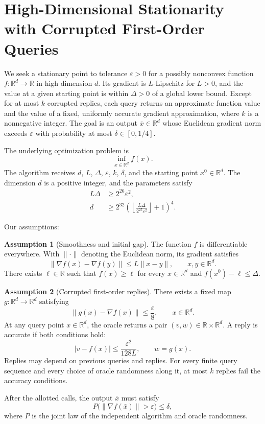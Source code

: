 \documentclass[10pt]{article}
\theoremstyle{definition}
\newtheorem{assumption}{Assumption}
\begin{document}
\section*{High-Dimensional Stationarity with Corrupted First-Order Queries}
We seek a stationary point to tolerance $\varepsilon>0$ for a possibly nonconvex function $f:\mathbb{R}^d\to\mathbb{R}$ in high dimension $d$. Its gradient is $L$-Lipschitz for $L>0$, and the value at a given starting point is within $\Delta>0$ of a global lower bound. Except for at most $k$ corrupted replies, each query returns an approximate function value and the value of a fixed, uniformly accurate gradient approximation, where $k$ is a nonnegative integer. The goal is an output $\bar{x}\in\mathbb{R}^d$ whose Euclidean gradient norm exceeds $\varepsilon$ with probability at most $\delta\in[0,1/4]$.

The underlying optimization problem is
\[
\inf_{x\in\mathbb{R}^d} f(x).
\]
The algorithm receives $d$, $L$, $\Delta$, $\varepsilon$, $k$, $\delta$, and the starting point $x^0\in\mathbb{R}^d$. The dimension $d$ is a positive integer, and the parameters satisfy
\[
\begin{aligned}
L\Delta &\geq 2^{26}\varepsilon^2,\\
d &\geq 2^{32}\left(\left\lfloor\frac{L\Delta}{2^{25}\varepsilon^2}\right\rfloor+1\right)^4.
\end{aligned}
\]

Our assumptions:
\begin{assumption}[Smoothness and initial gap]
The function $f$ is differentiable everywhere. With $\|\cdot\|$ denoting the Euclidean norm, its gradient satisfies
\[
\|\nabla f(x)-\nabla f(y)\|\leq L\|x-y\|,\qquad x,y\in\mathbb{R}^d.
\]
There exists $\ell\in\mathbb{R}$ such that $f(x)\geq\ell$ for every $x\in\mathbb{R}^d$ and $f(x^0)-\ell\leq\Delta$.
\end{assumption}

\begin{assumption}[Corrupted first-order replies]
There exists a fixed map $g:\mathbb{R}^d\to\mathbb{R}^d$ satisfying
\[
\|g(x)-\nabla f(x)\|\leq\frac{\varepsilon}{8},\qquad x\in\mathbb{R}^d.
\]
At any query point $x\in\mathbb{R}^d$, the oracle returns a pair $(v,w)\in\mathbb{R}\times\mathbb{R}^d$. A reply is accurate if both conditions hold:
\[
|v-f(x)|\leq\frac{\varepsilon^2}{128L},\qquad w=g(x).
\]
Replies may depend on previous queries and replies. For every finite query sequence and every choice of oracle randomness along it, at most $k$ replies fail the accuracy conditions.
\end{assumption}

After the allotted calls, the output $\bar{x}$ must satisfy
\[
P\bigl(\|\nabla f(\bar{x})\|>\varepsilon\bigr)\leq\delta,
\]
where $P$ is the joint law of the independent algorithm and oracle randomness.
\end{document}

